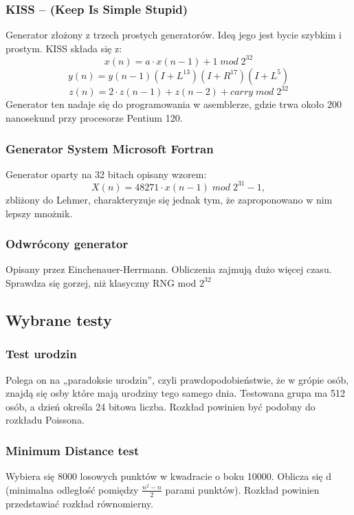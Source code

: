 \documentclass[11pt]{aghdpl}
\begin{document}
\subsubsection{KISS – (Keep Is Simple Stupid)}
Generator złożony z trzech prostych generatorów. Ideą jego jest bycie szybkim i prostym. KISS składa się z:
\begin{equation}
x(n) = a \cdot x (n-1)+1 \; mod \; 2^{32}
\end{equation}
\begin{equation}
y(n)=y(n-1)(I+L^{13})(I+R^{17})(I+L^5)
\end{equation}
\begin{equation}
z(n)=2 \cdot z(n-1)+z(n-2) +carry \; mod \; 2^{32}
\end{equation}
Generator ten nadaje się do programowania w asemblerze, gdzie trwa około 200 nanosekund przy procesorze Pentium 120.
\subsubsection{Generator System Microsoft Fortran}
Generator oparty na 32 bitach opisany wzorem:
\begin{equation}
X ( n ) = 48271 \cdot x (n- 1 )\; mod\; 2 ^ {31}-1,
\end{equation}
zbliżony do Lehmer, charakteryzuje się jednak tym, że zaproponowano w nim lepszy mnożnik. 
\subsubsection{Odwrócony generator}
Opisany przez Einchenauer-Herrmann. Obliczenia zajmują dużo więcej czasu. Sprawdza się gorzej, niż klasyczny RNG mod $2^{32}$
\subsection{Wybrane testy}
\subsubsection{Test urodzin}
Polega on na „paradoksie urodzin”, czyli prawdopodobieństwie, że w grópie osób, znajdą się osby które mają urodziny tego samego dnia. Testowana grupa ma 512 osób, a dzień określa 24 bitowa liczba. Rozkład powinien być podobny do rozkładu Poissona.
\subsubsection{Minimum Distance test}
Wybiera się 8000 losowych punktów w kwadracie o boku 10000. Oblicza się d (minimalna odległość pomiędzy $\frac{n^2 -n}{2}$ parami punktów). Rozkład powinien przedstawiać rozkład równomierny.
\end{document}
